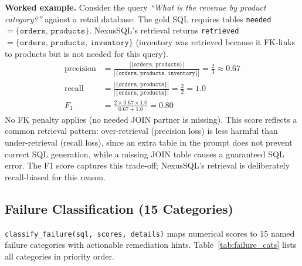 \documentclass[conference]{IEEEtran}
\begin{document}
\textbf{Worked example.}
Consider the query \emph{``What is the revenue by product category?''}
against a retail database. The gold SQL requires tables
\texttt{needed} $= \{\texttt{orders},\, \texttt{products}\}$.
NexusSQL's retrieval returns
\texttt{retrieved} $= \{\texttt{orders},\, \texttt{products},\, \texttt{inventory}\}$
(inventory was retrieved because it FK-links to products but is not
needed for this query).
\begin{align*}
\text{precision} &= \frac{|\{\texttt{orders, products}\}|}{|\{\texttt{orders, products, inventory}\}|}
  = \frac{2}{3} \approx 0.67 \\
\text{recall}    &= \frac{|\{\texttt{orders, products}\}|}{|\{\texttt{orders, products}\}|}
  = \frac{2}{2} = 1.0 \\
F_1              &= \frac{2 \times 0.67 \times 1.0}{0.67 + 1.0} = 0.80
\end{align*}
No FK penalty applies (no needed JOIN partner is missing).
This score reflects a common retrieval pattern: over-retrieval (precision
loss) is less harmful than under-retrieval (recall loss), since an extra
table in the prompt does not prevent correct SQL generation, while a
missing JOIN table causes a guaranteed SQL error. The F1 score captures
this trade-off; NexusSQL's retrieval is deliberately recall-biased for
this reason.

\subsection{Failure Classification (15 Categories)}

\texttt{classify\_failure(sql, scores, details)} maps numerical scores to
15 named failure categories with actionable remediation hints.
Table~\ref{tab:failure_cats} lists all categories in priority order.
\end{document}
